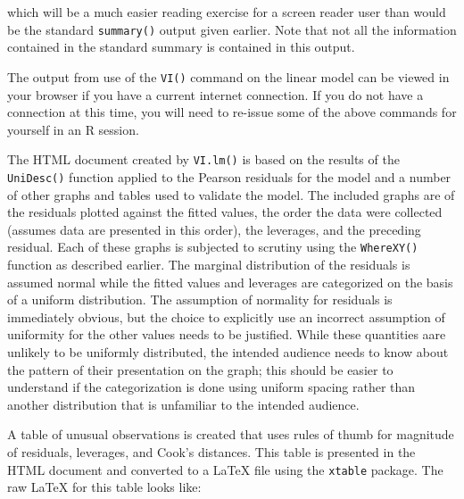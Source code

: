 \documentclass[
]{book}
\begin{document}
which will be a much easier reading exercise for a screen reader user than would be the standard \texttt{summary()} output given earlier. Note that not all the information contained in the standard summary is contained in this output.

The output from use of the \texttt{VI()} command on the linear model can be viewed in your browser if you have a current internet connection. If you do not have a connection at this time, you will need to re-issue some of the above commands for yourself in an R session.

The HTML document created by \texttt{VI.lm()} is based on the results of the \texttt{UniDesc()} function applied to the Pearson residuals for the model and a number of other graphs and tables used to validate the model. The included graphs are of the residuals plotted against the fitted values, the order the data were collected (assumes data are presented in this order), the leverages, and the preceding residual.
Each of these graphs is subjected to scrutiny using the \texttt{WhereXY()} function as described earlier. The marginal distribution of the residuals is assumed normal while the fitted values and leverages are categorized on the basis of a uniform distribution. The assumption of normality for residuals is immediately obvious, but the choice to explicitly use an incorrect assumption of uniformity for the other values needs to be justified. While these quantities aare unlikely to be uniformly distributed, the intended audience needs to know about the pattern of their presentation on the graph; this should be easier to understand if the categorization is done using uniform spacing rather than another distribution that is unfamiliar to the intended audience.

A table of unusual observations is created that uses rules of thumb for magnitude of residuals, leverages, and Cook's distances. This table is presented in the HTML document and converted to a LaTeX file using the \texttt{xtable} package. The raw LaTeX for this table looks like:
\end{document}
